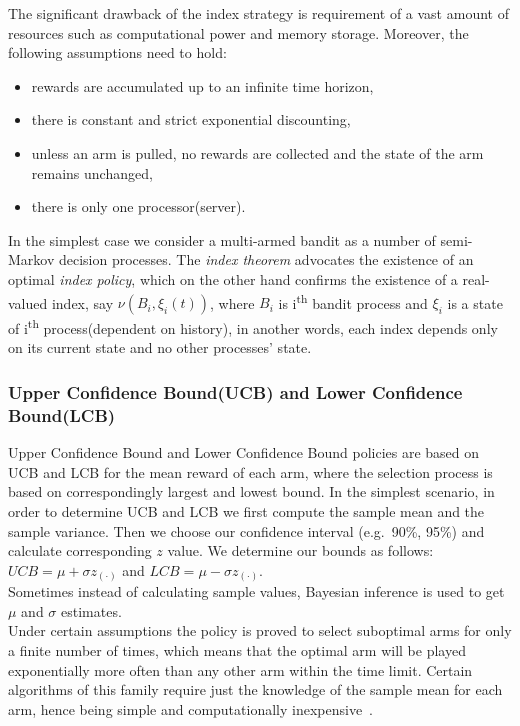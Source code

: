 \documentclass[12pt, a4paper, pdflatex, leqno, twoside]{report}
\newcommand{\ts}{\textsuperscript}
\begin{document}
The significant drawback of the index strategy is requirement of a vast amount of 
resources such as computational power and memory storage. Moreover, the 
following assumptions need to hold:
\begin{itemize}
\item rewards are accumulated up to an infinite time horizon,
\item there is constant and strict exponential discounting,
\item unless an arm is pulled, no rewards are collected and the state of the arm remains unchanged,
\item there is only one processor(server).\\
\end{itemize}

In the simplest case we consider a multi-armed bandit as a number of semi-Markov 
decision processes. The \emph{index theorem} advocates the existence of an optimal \emph{index policy}, 
which on the other hand confirms the existence of a real-valued index, say $\nu ( B_i , \xi_i(t) )$, where $B_i$ is i\ts{th} bandit 
process and $\xi_i$ is a state of i\ts{th} process(dependent on history), in another words, each index depends 
only on its current state and no other processes' state. \\

\subsubsection{Upper Confidence Bound(UCB) and Lower Confidence Bound(LCB)}
Upper Confidence Bound and Lower Confidence Bound policies are based on UCB and LCB for the mean reward of each arm, where 
the selection process is based on correspondingly largest and lowest bound. In the simplest scenario, in order to determine UCB and LCB we first compute the sample mean and the sample variance. Then we choose our confidence interval (e.g.\ 90\%, 95\%) and calculate corresponding $z$ value. We determine our bounds as follows: $UCB = \mu + \sigma z_{(\cdot)} $ and $LCB = \mu - \sigma z_{(\cdot)} $.\\
Sometimes instead of calculating sample values, Bayesian inference is used to get $\mu$ and $\sigma$ estimates.\\
Under certain assumptions the policy is proved to select suboptimal 
arms for only a finite number of times, which means that the optimal arm will be played exponentially more 
often than any other arm within the time limit. Certain algorithms of this family require 
just the knowledge of the sample mean for each arm, hence being simple and 
computationally inexpensive~\citep{Scott:2010:MBL:1944422.1944432}.\\
\end{document}
